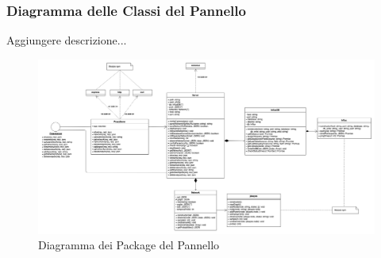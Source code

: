 \subsubsection{Diagramma delle Classi del Pannello}
Aggiungere descrizione...
\begin{landscape}
\begin{figure}[H]
	\begin{center}
		\includegraphics[scale=0.3]{./images/serverClassi.png} 
	\end{center}
	\caption{Diagramma dei Package del Pannello}
\end{figure}
\end{landscape}